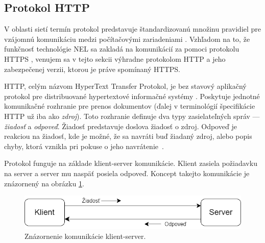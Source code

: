 \subsection{Protokol HTTP}
\label{protokol-http}

V oblasti sietí termín protokol predstavuje štandardizovanú množinu pravidiel pre vzájomnú komunikáciu medzi počítačovými zariadeniami \cite{cloudflare-protocol}.
Vzhľadom na to, že funkčnosť technológie NEL sa zakladá na komunikácií za pomoci protokolu HTTPS  \cite{nel-client-side-measurement-e2e-reliability},
venujem sa v tejto sekcii výhradne protokolom HTTP a jeho zabezpečenej verzii, ktorou je práve spomínaný HTTPS.

HTTP, celým názvom HyperText Transfer Protokol, je bez stavový aplikačný protokol pre distribuované hypertextové informačné systémy \cite{rfc9110}. 
Poskytuje jednotné komunikačné rozhranie pre prenos dokumentov (ďalej v terminológií špecifikácie HTTP už iba ako \emph{zdroj}).
Toto rozhranie definuje dva typy zasielateľných správ --- \emph{žiadosť} a \emph{odpoveď}. 
Žiadosť predstavuje doslova žiadosť o zdroj. 
Odpoveď je reakciou na žiadosť, kde je možné, že sa navráti buď žiadaný zdroj, alebo popis chyby, ktorá vznikla pri pokuse o jeho \mbox{navrátenie \cite{rfc7230}}. 

Protokol funguje na základe klient-server komunikácie. Klient zasiela požiadavku na server a server mu naspäť posiela odpoveď.
Koncept takejto komunikácie je znázornený na obrázku \ref{fig:http-client-server}.

\begin{figure}[htb]
\begin{center}
    \includegraphics[scale=0.6]{obrazky-figures/http-client-server.png}
    \caption{Znázornenie komunikácie klient-server.}
    \label{fig:http-client-server}
\end{center}
\end{figure}

